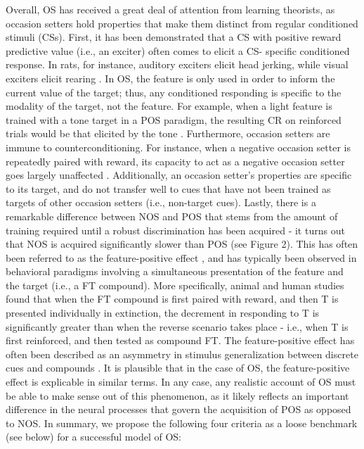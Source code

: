 \documentclass[11pt]{article}
\let\cite=\citep
\begin{document}
Overall, OS has received a great deal of attention from learning theorists, as 
occasion setters hold properties that make them distinct from regular 
conditioned stimuli (CSs). First, it has been demonstrated that a CS with 
positive reward predictive value (i.e., an exciter) often comes to elicit a CS-
specific conditioned response. In rats, for instance, auditory exciters elicit 
head jerking, while visual exciters elicit rearing \cite{Holland1984}. In OS, 
the feature is only used in order to inform the current value of the target; 
thus, any conditioned responding is specific to the modality of the target, not 
the feature. For example, when a light feature is trained with a tone target in 
a POS paradigm, the resulting CR on reinforced trials would be that elicited by 
the tone \cite{Ross1981}. Furthermore, occasion setters are immune to 
counterconditioning. For instance, when a negative occasion setter is 
repeatedly paired with reward, its capacity to act as a negative occasion 
setter goes largely unaffected \cite{Holland1991, Holland1992}. Additionally, 
an occasion setter's properties are specific to its target, and do not transfer 
well to cues that have not been trained as targets of other occasion setters 
(i.e., non-target cues). Lastly, there is a remarkable difference between NOS 
and POS that stems from the amount of training required until a robust 
discrimination has been acquired - it turns out that NOS is acquired 
significantly slower than POS (see Figure 2). This has often been referred to 
as the feature-positive effect \cite{Jenkins1970}, and has typically been 
observed in behavioral paradigms involving a simultaneous presentation of the 
feature and the target (i.e., a FT compound). More specifically, animal 
\cite{Gonzalez2003} and human \cite{Wheeler2006} studies found that when the FT 
compound is first paired with reward, and then T is presented individually in 
extinction, the decrement in responding to T is significantly greater than when 
the reverse scenario takes place - i.e., when T is first reinforced, and then 
tested as compound FT. The feature-positive effect has often been described as 
an asymmetry in stimulus generalization between discrete cues and compounds 
\cite{Bouton2012}. It is plausible that in the case of OS, the feature-positive 
effect is explicable in similar terms. In any case, any realistic account of OS 
must be able to make sense out of this phenomenon, as it likely reflects an 
important difference in the neural processes that govern the acquisition of POS 
as opposed to NOS. In summary, we propose the following four criteria as a 
loose benchmark (see below) for a successful model of OS:
\end{document}
